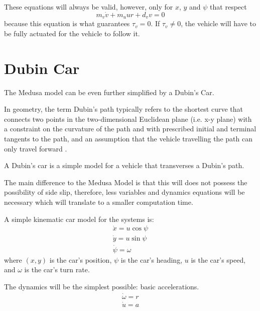 \par These equations will always be valid, however, only for $x$, $y$ and $\psi$ that respect
\begin{equation}
    m_v \dot{v} + m_u u r + d_v v = 0
    \label{eq:onlymandatoryconstraint}
\end{equation}
because this equation is what guarantees $\tau_v = 0$. If $\tau_v \neq 0$, the vehicle will have to be fully actuated for the vehicle to follow it.



\section{Dubin Car}
\label{sec:dubincarequations}

\par The Medusa model can be even further simplified by a Dubin's Car.
\par In geometry, the term Dubin's path typically refers to the shortest curve that connects two points in the two-dimensional Euclidean plane (i.e. x-y plane) with a constraint on the curvature of the path and with prescribed initial and terminal tangents to the path, and an assumption that the vehicle travelling the path can only travel forward \cite{wiki:dubincar}. 
\par A Dubin's car is a simple model for a vehicle that transverses a Dubin's path.
\par The main difference to the Medusa Model is that this will does not possess the possibility of side slip, therefore, less variables and dynamics equations will be necessary which will translate to a smaller computation time.

\par A simple kinematic car model for the systems is: 
\begin{equation}
    \begin{gathered}
        \dot{x} = u \cos \psi \\
        \dot{y} = u \sin \psi \\
        \dot{\psi} = \omega
    \end{gathered}
\end{equation}
where $(x,y)$ is the car's position, $\psi$ is the car's heading, $u$ is the car's speed, and $\omega$ is the car's turn rate.

\par The dynamics will be the simplest possible: basic accelerations.
\begin{equation}
    \begin{gathered}
        \dot{\omega} = r \\
        \dot{u} = a
    \end{gathered}
\end{equation}

